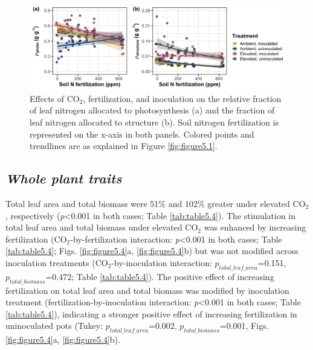 \newpage
\begin{landscape}
    \begin{figure}
        \centering
        \includegraphics[scale = 0.075]{ch5_NxCO2xI/figs/NxCO2xI_fig3_propN.png}
        \caption[Effects of CO$_2$, fertilization, and inoculation on the relative fraction of leaf nitrogen allocated to photosynthesis and the fraction of leaf nitrogen allocated to structure]{Effects of CO$_2$, fertilization, and inoculation on the relative fraction of leaf nitrogen allocated to photosynthesis (a) and the fraction of leaf nitrogen allocated to structure (b). Soil nitrogen fertilization is represented on the x-axis in both panels. Colored points and trendlines are as explained in Figure \ref{fig:figure5.1}.}
        \label{fig:figure5.3}
    \end{figure}
\end{landscape}
\clearpage

\subsection{\textit{Whole plant traits}}
\noindent Total leaf area and total biomass were 51\% and 102\% greater under elevated CO$_2$, respectively (\textit{p}<0.001 in both cases; Table \ref{tab:table5.4}). The stimulation in total leaf area and total biomass under elevated CO$_2$ was enhanced by increasing fertilization (CO$_2$-by-fertilization interaction: \textit{p}<0.001 in both cases; Table \ref{tab:table5.4}; Figs. \ref{fig:figure5.4}a, \ref{fig:figure5.4}b) but was not modified across inoculation treatments (CO$_2$-by-inoculation interaction: $p_{total\_leaf\_area}$=0.151, $p_{total\_biomass}$=0.472; Table \ref{tab:table5.4}). The positive effect of increasing fertilization on total leaf area and total biomass was modified by inoculation treatment (fertilization-by-inoculation interaction: \textit{p}<0.001 in both cases; Table \ref{tab:table5.4}), indicating a stronger positive effect of increasing fertilization in uninoculated pots (Tukey: $p_{total\_leaf\_area}$=0.002, $p_{total\_biomass}$=0.001, Figs. \ref{fig:figure5.4}a, \ref{fig:figure5.4}b).

